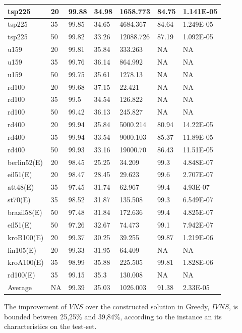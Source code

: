 \begin{center}
\begin{longtable}{|l|l|l|l|l|l|l|}
\hline	tsp225	&	20	&	99.88	&	34.98	&	1658.773	&	84.75	&	1.141E-05	\\
\hline	tsp225	&	35	&	99.85	&	34.65	&	4684.367	&	84.64	&	1.249E-05	\\
\hline	tsp225	&	50	&	99.82	&	33.26	&	12088.726	&	87.19	&	1.092E-05	\\
\hline	u159	&	20	&	99.81	&	35.84	&	333.263	&	NA	&	NA	\\
\hline	u159	&	35	&	99.76	&	36.14	&	864.992	&	NA	&	NA	\\
\hline	u159	&	50	&	99.75	&	35.61	&	1278.13	&	NA	&	NA	\\
\hline	rd100	&	20	&	99.68	&	37.15	&	22.421	&	NA	&	NA	\\
\hline	rd100	&	35	&	99.5	&	34.54	&	126.822	&	NA	&	NA	\\
\hline	rd100	&	50	&	99.42	&	36.13	&	245.827	&	NA	&	NA	\\
\hline	rd400	&	20	&	99.94	&	35.84	&	5000.214	&	80.94	&	14.22E-05	\\
\hline	rd400	&	35	&	99.94	&	33.54	&	9000.103	&	85.37	&	11.89E-05	\\
\hline	rd400	&	50	&	99.93	&	33.16	&	19000.70	&	86.43	&	11.51E-05	\\
\hline	berlin52(E)	&	20	&	98.45	&	25.25	&	34.209	&	99.3	&	4.848E-07	\\
\hline	eil51(E)	&	20	&	98.47	&	28.45	&	29.623	&	99.6	&	2.707E-07	\\
\hline	att48(E)	&	35	&	97.45	&	31.74	&	62.967	&	99.4	&	4.93E-07	\\
\hline	st70(E)	&	35	&	98.52	&	31.87	&	135.508	&	99.3	&	6.549E-07	\\
\hline	brazil58(E)	&	50	&	97.48	&	31.84	&	172.636	&	99.4	&	4.825E-07	\\
\hline	eil51(E)	&	50	&	97.26	&	32.67	&	74.473	&	99.1	&	7.942E-07	\\
\hline	kroB100(E)	&	20	&	99.37	&	30.25	&	39.255	&	99.87	&	1.219E-06	\\
\hline	lin105(E)	&	20	&	99.33	&	31.95	&	64.409	&	NA	&	NA	\\
\hline	kroA100(E)	&	35	&	98.99	&	35.88	&	225.505	&	99.81	&	1.828E-06	\\
\hline	rd100(E)	&	35	&	99.15	&	35.3	&	130.008	&	NA	&	NA	\\
\hline Average     & NA    &   99.39   &  35.03   &    1026.003 &  91.38 & 2.33E-05 \\
\hline
\end{longtable}
\end{center}
The improvement of $VNS$ over the constructed solution in Greedy, $IVNS$, is bounded between 
25,25\% and 39,84\%, according to the instance an its characteristics on the test-set.\\

